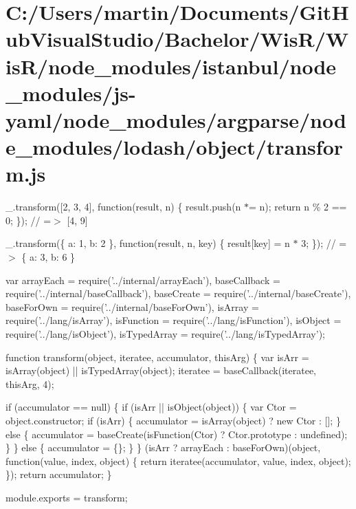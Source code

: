 \hypertarget{_c_1_2_users_2martin_2_documents_2_git_hub_visual_studio_2_bachelor_2_wis_r_2_wis_r_2node_moduleb821af34deb9efd729639cdaa46510d2}{}\section{C\+:/\+Users/martin/\+Documents/\+Git\+Hub\+Visual\+Studio/\+Bachelor/\+Wis\+R/\+Wis\+R/node\+\_\+modules/istanbul/node\+\_\+modules/js-\/yaml/node\+\_\+modules/argparse/node\+\_\+modules/lodash/object/transform.\+js}
\+\_\+.\+transform(\mbox{[}2, 3, 4\mbox{]}, function(result, n) \{ result.\+push(n $\ast$= n); return n \% 2 == 0; \}); // =$>$ \mbox{[}4, 9\mbox{]}

\+\_\+.\+transform(\{ \textquotesingle{}a\textquotesingle{}\+: 1, \textquotesingle{}b\textquotesingle{}\+: 2 \}, function(result, n, key) \{ result\mbox{[}key\mbox{]} = n $\ast$ 3; \}); // =$>$ \{ \textquotesingle{}a\textquotesingle{}\+: 3, \textquotesingle{}b\textquotesingle{}\+: 6 \}


\begin{DoxyCodeInclude}
var arrayEach = require(\textcolor{stringliteral}{'../internal/arrayEach'}),
    baseCallback = require(\textcolor{stringliteral}{'../internal/baseCallback'}),
    baseCreate = require(\textcolor{stringliteral}{'../internal/baseCreate'}),
    baseForOwn = require(\textcolor{stringliteral}{'../internal/baseForOwn'}),
    isArray = require(\textcolor{stringliteral}{'../lang/isArray'}),
    isFunction = require(\textcolor{stringliteral}{'../lang/isFunction'}),
    isObject = require(\textcolor{stringliteral}{'../lang/isObject'}),
    isTypedArray = require(\textcolor{stringliteral}{'../lang/isTypedArray'});

\textcolor{keyword}{function} transform(\textcolor{keywordtype}{object}, iteratee, accumulator, thisArg) \{
  var isArr = isArray(\textcolor{keywordtype}{object}) || isTypedArray(\textcolor{keywordtype}{object});
  iteratee = baseCallback(iteratee, thisArg, 4);

  \textcolor{keywordflow}{if} (accumulator == null) \{
    \textcolor{keywordflow}{if} (isArr || isObject(\textcolor{keywordtype}{object})) \{
      var Ctor = \textcolor{keywordtype}{object}.constructor;
      \textcolor{keywordflow}{if} (isArr) \{
        accumulator = isArray(\textcolor{keywordtype}{object}) ? \textcolor{keyword}{new} Ctor : [];
      \} \textcolor{keywordflow}{else} \{
        accumulator = baseCreate(isFunction(Ctor) ? Ctor.prototype : undefined);
      \}
    \} \textcolor{keywordflow}{else} \{
      accumulator = \{\};
    \}
  \}
  (isArr ? arrayEach : baseForOwn)(\textcolor{keywordtype}{object}, \textcolor{keyword}{function}(value, index, \textcolor{keywordtype}{object}) \{
    \textcolor{keywordflow}{return} iteratee(accumulator, value, index, \textcolor{keywordtype}{object});
  \});
  \textcolor{keywordflow}{return} accumulator;
\}

module.exports = transform;
\end{DoxyCodeInclude}
 
